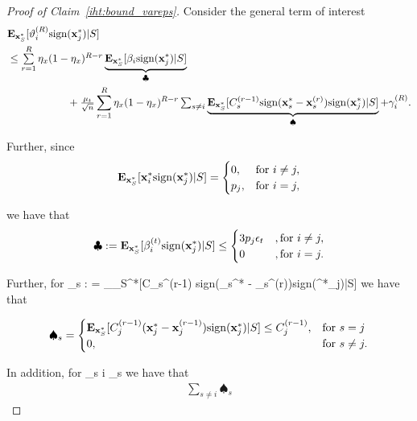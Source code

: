 \documentclass{article}
\newcommand{\sgn}{{\rm sign}}
\def\[#1\]{{$#1$}}
\def\b#1{{\mathbf{#1}}}
\begin{document}
\begin{proof}[Proof of Claim~\ref{iht:bound_vareps}]
	Consider the general term of interest
	\begin{align*}
	&\b{E}_{\b{x}_S^*}[\vartheta^{(R)}_{i}\sgn(\b{x}^*_{j})|S]\\
	
	
	&\leq \textstyle\sum\limits_{r = 1}^{R}\eta_{x}(1- \eta_x)^{{R} - r} \underbrace{\b{E}_{\b{x}_S^*}[\beta_{i} \sgn(\b{x}^*_{j})|S]}_{\clubsuit} \\ &\hspace{2cm}+ \tfrac{\mu_t}{\sqrt{n}}\sum\limits_{r = 1}^{R }\eta_{x}(1- \eta_x)^{{R} - r }\textstyle\sum_{s \neq i} \underbrace{\b{E}_{\b{x}_S^*}[C_{s}^{(r-1)} \sgn(\b{x}_{s}^* - \b{x}_{s}^{(r)})\sgn(\b{x}^*_{j})|S]}_{\spadesuit} + \gamma^{(R)}_{i} .
	
	
	
	\end{align*}
	
     Further, since 
	\begin{align*}
	\b{E}_{\b{x}_S^*}[\b{x}_i^*\sgn(\b{x}^*_{j})|S] = 
	\begin{cases}
	0, & \text{for}~ i \neq j,\\
	p_{j}, & \text{for}~ i = j,
	\end{cases}
	\end{align*}
	
	we have that
	\begin{align}\label{eq:beta_cases}
	\clubsuit:= \b{E}_{\b{x}_S^*}[ \beta^{(t)}_{i}\sgn(\b{x}^*_{j})| S] \leq
	\begin{cases}
		3p_{j}\epsilon_t &,\text{for}~ i \neq j,\\
	0 &,\text{for}~ i = j.
	\end{cases}
	\end{align}
	
	Further, for  \[\spadesuit_s : = \b{E}_{\b{x}_S^*}[C_{s}^{(r-1)} \sgn(\b{x}_{s}^* - \b{x}_{s}^{(r)})\sgn(\b{x}^*_{j})|S]\] we have that
	
	\begin{align*}
	\spadesuit_s 
	=
	\begin{cases}
	\b{E}_{\b{x}_S^*}[C_{j}^{(r-1)}(\b{x}_{j}^* - \b{x}_{j}^{(r-1)})\sgn(\b{x}^*_{j})|S] \leq C^{(r-1)}_{j}, &\text{for}~ s = j\\
	0, &\text{for}~ s \neq j.
	\end{cases}
	\end{align*}
	
	In addition, for \[\textstyle\sum_{s \neq i} \spadesuit_s\] we have that
	\begin{align}\label{eq:C_cases}
	\textstyle\sum_{s \neq i} \spadesuit_s 
	

\end{align}
\end{proof}
\end{document}
